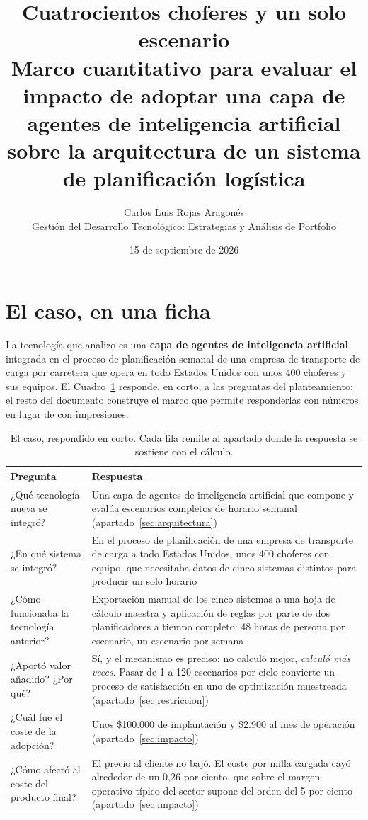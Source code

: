 \documentclass[11pt,letterpaper]{article}
\title{\vspace{-1.2cm}\textbf{Cuatrocientos choferes y un solo escenario}\\
\large Marco cuantitativo para evaluar el impacto de adoptar una capa de
agentes de inteligencia artificial sobre la arquitectura de un sistema de
planificación logística}
\author{Carlos Luis Rojas Aragonés\\
\small Gestión del Desarrollo Tecnológico: Estrategias y Análisis de Portfolio}
\date{\small 15 de septiembre de 2026}
\begin{document}
\maketitle
\vspace{-0.8em}

\section{El caso, en una ficha}

La tecnología que analizo es una \textbf{capa de agentes de inteligencia
artificial} integrada en el proceso de planificación semanal de una empresa de
transporte de carga por carretera que opera en todo Estados Unidos con unos
400 choferes y sus equipos. El Cuadro~\ref{cuadro:ficha} responde, en corto, a
las preguntas del planteamiento; el resto del documento construye el marco que
permite responderlas con números en lugar de con impresiones.

\begin{table}[b]
\small
\caption{El caso, respondido en corto. Cada fila remite al apartado donde la
respuesta se sostiene con el cálculo.}
\label{cuadro:ficha}
\begin{tabularx}{\textwidth}{@{}p{5.1cm}X@{}}
\toprule
\textbf{Pregunta} & \textbf{Respuesta} \\
\midrule
¿Qué tecnología nueva se integró?
& Una capa de agentes de inteligencia artificial que compone y evalúa
  escenarios completos de horario semanal (apartado~\ref{sec:arquitectura}) \\
\addlinespace[2pt]
¿En qué sistema se integró?
& En el proceso de planificación de una empresa de transporte de carga a todo
  Estados Unidos, unos 400 choferes con equipo, que necesitaba datos de cinco
  sistemas distintos para producir un solo horario \\
\addlinespace[2pt]
¿Cómo funcionaba la tecnología anterior?
& Exportación manual de los cinco sistemas a una hoja de cálculo maestra y
  aplicación de reglas por parte de dos planificadores a tiempo completo:
  48 horas de persona por escenario, un escenario por semana \\
\addlinespace[2pt]
¿Aportó valor añadido? ¿Por qué?
& Sí, y el mecanismo es preciso: no calculó mejor, \emph{calculó más veces}.
  Pasar de 1 a 120 escenarios por ciclo convierte un proceso de satisfacción
  en uno de optimización muestreada (apartado~\ref{sec:restriccion}) \\
\addlinespace[2pt]
¿Cuál fue el coste de la adopción?
& Unos \$100.000 de implantación y \$2.900 al mes de operación
  (apartado~\ref{sec:impacto}) \\
\addlinespace[2pt]
¿Cómo afectó al coste del producto final?
& El precio al cliente no bajó. El coste por milla cargada cayó alrededor de
  un 0,26 por ciento, que sobre el margen operativo típico del sector supone
  del orden del 5 por ciento (apartado~\ref{sec:impacto}) \\
\bottomrule
\end{tabularx}
\end{table}
\end{document}
